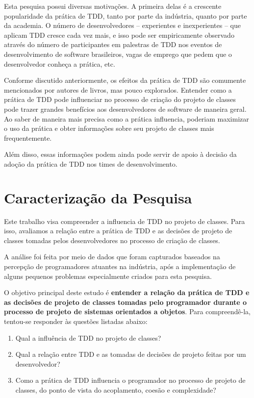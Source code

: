 Esta pesquisa possui diversas motivações. A primeira delas é a crescente
popularidade da prática de TDD, tanto por parte da indústria, quanto 
por parte da academia. O número de desenvolvedores -- experientes e inexperientes --
que aplicam TDD cresce cada vez mais, e isso pode ser empiricamente
observado através do número de participantes em palestras de TDD nos
eventos de desenvolvimento de software brasileiros, vagas de emprego
que pedem que o desenvolvedor conheça a prática, etc.

Conforme discutido anteriormente, os efeitos da prática de TDD são
comumente mencionados por autores de livros, mas pouco explorados. 
Entender como a prática de TDD pode influenciar no processo
de criação do projeto de classes pode trazer grandes benefícios
aos desenvolvedores de software de maneira geral.
Ao saber de maneira mais precisa
como a prática influencia, poderiam maximizar o uso da prática e obter
informações sobre seu projeto de classes mais frequentemente.

Além disso, essas informações podem ainda pode servir de apoio à decisão da 
adoção da prática de TDD nos times de desenvolvimento.


\section{Caracterização da Pesquisa}

Este trabalho
visa compreender a influencia de TDD no projeto de classes.
Para isso, avaliamos a relação entre a prática de 
TDD
e as decisões de projeto de classes tomadas pelos desenvolvedores no processo de 
criação de classes.

A análise foi feita por meio de dados que foram
capturados baseados na percepção de programadores atuantes na indústria, após
a implementação de alguns pequenos problemas especialmente criados para
esta pesquisa.

O objetivo principal deste estudo é \textbf{entender a relação da prática de TDD 
e as decisões de projeto de classes tomadas pelo programador durante o processo de 
projeto de sistemas orientados a objetos}.
Para compreendê-la, tentou-se responder às questões listadas
abaixo:

\begin{enumerate}

	\item Qual a influência de TDD no projeto de classes?

	\item Qual a relação entre TDD e as tomadas de decisões de projeto
	feitas por um desenvolvedor?

	\item Como a prática de TDD influencia o programador no processo de  
	projeto de classes, do ponto de vista do acoplamento, coesão e complexidade?

\end{enumerate}

